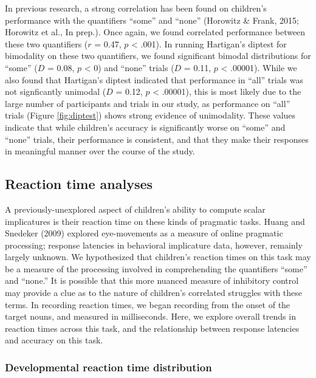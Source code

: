 \documentclass[10pt, letterpaper]{article}
\begin{document}
In previous research, a strong correlation has been found on children's
performance with the quantifiers ``some'' and ``none'' (Horowitz \&
Frank, 2015; Horowitz et al., In prep.). Once again, we found correlated
performance between these two quantifiers (\(r\) = 0.47, \(p\)
\textless{} .001). In running Hartigan's diptest for bimodality on these
two quantifiers, we found significant bimodal distributions for ``some''
(\(D\) = 0.08, \(p\) \textless{} 0) and ``none'' trials (\(D\) = 0.11,
\(p\) \textless{} .00001). While we also found that Hartigan's diptest
indicated that performance in ``all'' trials was not signficantly
unimodal (\(D\) = 0.12, \(p\) \textless{} .00001), this is most likely
due to the large number of participants and trials in our study, as
performance on ``all'' trials (Figure \ref{fig:diptest}) shows strong
evidence of unimodality. These values indicate that while children's
accuracy is significantly worse on ``some'' and ``none'' trials, their
performance is consistent, and that they make their responses in
meaningful manner over the course of the study.

\subsection{Reaction time analyses}\label{reaction-time-analyses}

A previously-unexplored aspect of children's ability to compute scalar
implicatures is their reaction time on these kinds of pragmatic tasks.
Huang and Snedeker (2009) explored eye-movements as a measure of online
pragmatic processing; response latencies in behavioral implicature data,
however, remainly largely unknown. We hypothesized that children's
reaction times on this task may be a measure of the processing involved
in comprehending the quantifiers ``some'' and ``none.'' It is possible
that this more nuanced measure of inhibitory control may provide a clue
as to the nature of children's correlated struggles with these terms. In
recording reaction times, we began recording from the onset of the
target nouns, and measured in milliseconds. Here, we explore overall
trends in reaction times across this task, and the relationship between
response latencies and accuracy on this task.

\subsubsection{Developmental reaction time
distribution\\}\label{developmental-reaction-time-distribution}
\end{document}
